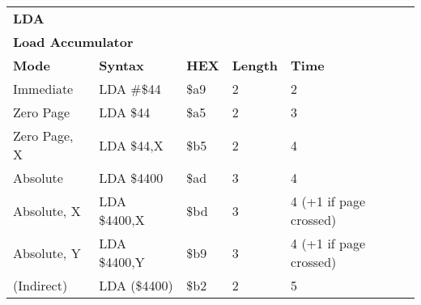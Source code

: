 \begin{table}[H]
\begin{tabular}{p{}p{}p{}p{}p{}}
\multicolumn{5}{p{0.22\textwidth}}{\huge\textbf{LDA}}\\
\multicolumn{5}{p{0.9\textwidth}}{\textbf{Load Accumulator}}\\ \hline
\multicolumn{1}{|p{0.22\textwidth}|}{\textbf{Mode}}&\multicolumn{1}{|p{0.2\textwidth}|}{\textbf{Syntax}}&\multicolumn{1}{|p{0.1\textwidth}|}{\textbf{HEX}}&\multicolumn{1}{|p{0.1\textwidth}|}{\textbf{Length}}&\multicolumn{1}{|p{0.4\textwidth}|}{\textbf{Time}}\\ \hline
\multicolumn{1}{|p{0.22\textwidth}|}{Immediate}&\multicolumn{1}{|p{0.2\textwidth}|}{LDA \#\$44}&\multicolumn{1}{|p{0.1\textwidth}|}{\$a9}&\multicolumn{1}{|p{0.1\textwidth}|}{2}&\multicolumn{1}{|p{0.4\textwidth}|}{2}\\ \hline
\multicolumn{1}{|p{0.22\textwidth}|}{Zero Page}&\multicolumn{1}{|p{0.2\textwidth}|}{LDA \$44}&\multicolumn{1}{|p{0.1\textwidth}|}{\$a5}&\multicolumn{1}{|p{0.1\textwidth}|}{2}&\multicolumn{1}{|p{0.4\textwidth}|}{3}\\ \hline
\multicolumn{1}{|p{0.22\textwidth}|}{Zero Page, X}&\multicolumn{1}{|p{0.2\textwidth}|}{LDA \$44,X}&\multicolumn{1}{|p{0.1\textwidth}|}{\$b5}&\multicolumn{1}{|p{0.1\textwidth}|}{2}&\multicolumn{1}{|p{0.4\textwidth}|}{4}\\ \hline
\multicolumn{1}{|p{0.22\textwidth}|}{Absolute}&\multicolumn{1}{|p{0.2\textwidth}|}{LDA \$4400}&\multicolumn{1}{|p{0.1\textwidth}|}{\$ad}&\multicolumn{1}{|p{0.1\textwidth}|}{3}&\multicolumn{1}{|p{0.4\textwidth}|}{4}\\ \hline
\multicolumn{1}{|p{0.22\textwidth}|}{Absolute, X}&\multicolumn{1}{|p{0.2\textwidth}|}{LDA \$4400,X}&\multicolumn{1}{|p{0.1\textwidth}|}{\$bd}&\multicolumn{1}{|p{0.1\textwidth}|}{3}&\multicolumn{1}{|p{0.4\textwidth}|}{4 (+1 if page crossed)}\\ \hline
\multicolumn{1}{|p{0.22\textwidth}|}{Absolute, Y}&\multicolumn{1}{|p{0.2\textwidth}|}{LDA \$4400,Y}&\multicolumn{1}{|p{0.1\textwidth}|}{\$b9}&\multicolumn{1}{|p{0.1\textwidth}|}{3}&\multicolumn{1}{|p{0.4\textwidth}|}{4 (+1 if page crossed)}\\ \hline
\multicolumn{1}{|p{0.22\textwidth}|}{(Indirect)}&\multicolumn{1}{|p{0.2\textwidth}|}{LDA (\$4400)}&\multicolumn{1}{|p{0.1\textwidth}|}{\$b2}&\multicolumn{1}{|p{0.1\textwidth}|}{2}&\multicolumn{1}{|p{0.4\textwidth}|}{5}\\ \hline

\end{tabular}
\end{table}

